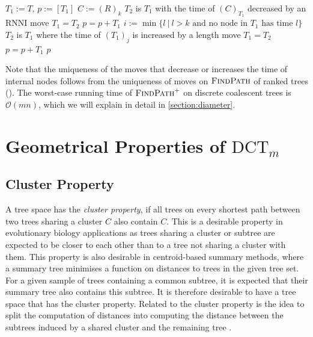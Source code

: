 \documentclass[11pt]{amsart}
\newcommand{\rnni}{\mathrm{RNNI}}
\newcommand{\findpath}{\textsc{FindPath}}
\newcommand{\ntime}{\mathrm{time}}
\newcommand{\dct}{\mathrm{DCT}}
\renewcommand{\O}{\mathcal O}
\newcommand{\summary}[1]{} %
\begin{document}
\begin{algorithm}[h]
	\caption{$\findpath^+$($T,R$)}
	\begin{algorithmic}[1]
		\label{alg:fp_dtt}
		\STATE $T_1 := T$, $p := [T_1]$
		 \label{alg:fp_dtt:for}
			\STATE $C:=(R)_k$
			\WHILE {$\ntime((C)_{T_1})>k$} \label{alg:fp_dtt:while}
					\STATE $T_2$ is $T_1$ with the time of $(C)_{T_1}$ decreased by an $\rnni$ move
				\STATE $T_1 = T_2$
				\STATE $p = p+T_1$
			\ENDWHILE
				\STATE $i := \min\{l \ |\  l>k \text{ and no node in } T_1 \text{ has time }l\}$ \label{line:min_free_time}
				 \label{alg:fp_dtt:nested_for}
					\label{line:length_move}
					\STATE $T_2$ is $T_1$ where the time of $(T_1)_j$ is increased by a length move
					\STATE $T_1 = T_2$
					\STATE $p = p+T_1$
				\ENDFOR
			\ENDIF
		\ENDFOR
		\RETURN $p$
	\end{algorithmic}
\end{algorithm}

Note that the uniqueness of the moves that decrease or increases the time of internal nodes follows from the uniqueness of moves on $\findpath$ of ranked trees (\autocite[Proposition 1]{Collienne2021}).
The worst-case running time of $\findpath^+$ on discrete coalescent trees is $\O(mn)$, which we will explain in detail in \autoref{section:diameter}.


\section{Geometrical Properties of $\dct_m$}
\label{section:geometry}

\subsection{Cluster Property}
\label{section:cluster_property}
\summary{Definition of Cluster Property and why it is relevant (a bit of bio).}
A tree space has the \emph{cluster property}, if all trees on every shortest path between two trees sharing a cluster $C$ also contain $C$.
This is a desirable property in evolutionary biology applications as trees sharing a cluster or subtree are expected to be closer to each other than to a tree not sharing a cluster with them.
This property is also desirable in centroid-based summary methods, where a summary tree minimises a function on distances to trees in the given tree set.
For a given sample of trees containing a common subtree, it is expected that their summary tree also contains this subtree.
It is therefore desirable to have a tree space that has the cluster property.
Related to the cluster property is the idea to split the computation of distances into computing the distance between the subtrees induced by a shared cluster and the remaining tree \autocite{Bordewich2005-nx}.
\end{document}
